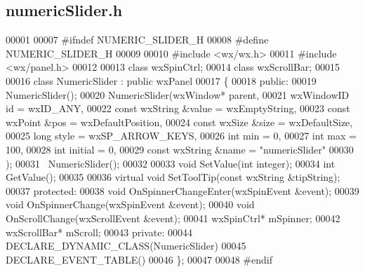 \subsection{numeric\+Slider.\+h}
\label{numericSlider_8h_source}

\begin{DoxyCode}
00001 
00007 \textcolor{preprocessor}{#ifndef NUMERIC\_SLIDER\_H}
00008 \textcolor{preprocessor}{#define NUMERIC\_SLIDER\_H}
00009 
00010 \textcolor{preprocessor}{#include <wx/wx.h>}
00011 \textcolor{preprocessor}{#include <wx/panel.h>}
00012 
00013 \textcolor{keyword}{class }wxSpinCtrl;
00014 \textcolor{keyword}{class }wxScrollBar;
00015 
00016 \textcolor{keyword}{class }NumericSlider : \textcolor{keyword}{public} wxPanel
00017 \{
00018 \textcolor{keyword}{public}:
00019     NumericSlider();
00020     NumericSlider(wxWindow* parent,
00021         wxWindowID \textcolor{keywordtype}{id} = wxID\_ANY,
00022         \textcolor{keyword}{const} wxString &value = wxEmptyString,
00023         \textcolor{keyword}{const} wxPoint &pos = wxDefaultPosition,
00024         \textcolor{keyword}{const} wxSize &size = wxDefaultSize,
00025         \textcolor{keywordtype}{long} style = wxSP\_ARROW\_KEYS,
00026         \textcolor{keywordtype}{int} min = 0,
00027         \textcolor{keywordtype}{int} max = 100,
00028         \textcolor{keywordtype}{int} initial = 0,
00029         \textcolor{keyword}{const} wxString &name = \textcolor{stringliteral}{"numericSlider"}
00030         );
00031    ~NumericSlider();
00032 
00033    \textcolor{keywordtype}{void} SetValue(\textcolor{keywordtype}{int} integer);
00034    \textcolor{keywordtype}{int} GetValue();
00035 
00036    \textcolor{keyword}{virtual} \textcolor{keywordtype}{void} SetToolTip(\textcolor{keyword}{const} wxString &tipString);
00037 \textcolor{keyword}{protected}:
00038     \textcolor{keywordtype}{void} OnSpinnerChangeEnter(wxSpinEvent &event);
00039     \textcolor{keywordtype}{void} OnSpinnerChange(wxSpinEvent &event);
00040     \textcolor{keywordtype}{void} OnScrollChange(wxScrollEvent &event);
00041     wxSpinCtrl* mSpinner;
00042     wxScrollBar* mScroll;
00043 \textcolor{keyword}{private}:
00044     DECLARE\_DYNAMIC\_CLASS(NumericSlider)
00045     DECLARE\_EVENT\_TABLE()
00046 \};
00047 
00048 \textcolor{preprocessor}{#endif}
\end{DoxyCode}
